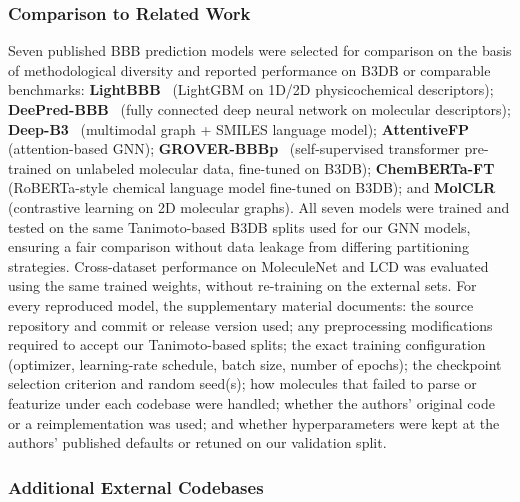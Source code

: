 \documentclass[conference]{IEEEtran}
\begin{document}
\subsubsection{Comparison to Related Work}

Seven published BBB prediction models were selected for comparison on
the basis of methodological diversity and reported performance on B3DB
or comparable benchmarks: \textbf{LightBBB}~\cite{Shaker2021} (LightGBM
on 1D/2D physicochemical descriptors); \textbf{DeePred-BBB}~\cite{Kumar2022}
(fully connected deep neural network on molecular descriptors);
\textbf{Deep-B3}~\cite{Tang2022} (multimodal graph + SMILES language
model); \textbf{AttentiveFP}~\cite{Xiong2020} (attention-based
GNN); \textbf{GROVER-BBBp}~\cite{Tong2022} (self-supervised
transformer pre-trained on unlabeled molecular data, fine-tuned on
B3DB); \textbf{ChemBERTa-FT}~\cite{Ahmad2022chemberta2} (RoBERTa-style
chemical language model fine-tuned on B3DB); and
\textbf{MolCLR}~\cite{Wang2022molclr} (contrastive learning on 2D
molecular graphs). All seven models were trained and tested on the
same Tanimoto-based B3DB splits used for our GNN models, ensuring a
fair comparison without data leakage from differing partitioning
strategies. Cross-dataset performance on MoleculeNet and LCD was
evaluated using the same trained weights, without re-training on the
external sets. For every reproduced model, the supplementary material
documents: the source repository and commit or release version used;
any preprocessing modifications required to accept our Tanimoto-based
splits; the exact training configuration (optimizer, learning-rate
schedule, batch size, number of epochs); the checkpoint selection
criterion and random seed(s); how molecules that failed to parse or
featurize under each codebase were handled; whether the authors'
original code or a reimplementation was used; and whether
hyperparameters were kept at the authors' published defaults or
retuned on our validation split.

\subsubsection{Additional External Codebases}
\label{sec:additional_models}
\end{document}
